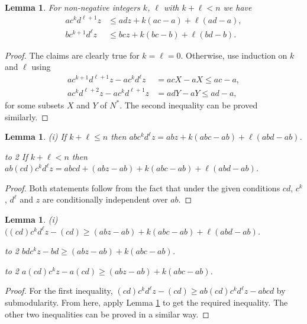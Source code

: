 \documentclass[reqno]{amsart}
\newtheorem{lemma}[theorem]{Lemma}
\theoremstyle{definition}
\renewcommand\ge{\geqslant}\renewcommand\le{\leqslant}
\def\titem#1{\noindent\hbox to 2\parindent{\hss\upshape
#1}\space\ignorespaces\advance\leftmargin2\parindent}
\begin{document}
\begin{lemma}\label{lemma:abdz}
For non-negative integers $k$, $\ell$ with $k+\ell<n$ we have
\begin{align*}
  ac^kd^{\ell+1}z &\le adz + k(ac-a) + \ell(ad-a), \\
  bc^{k+1}d^\ell z &\le bcz + k(bc-b) + \ell(bd-b).
\end{align*}
\end{lemma}
\begin{proof}
The claims are clearly true for $k=\ell=0$. Otherwise, use induction on $k$
and $\ell$ using
\begin{align*}
   ac^{k+1}d^{\ell+1}z - ac^kd^\ell z &= acX - aX \le ac -a, \\
   ac^kd^{\ell+2}z - ac^kd^{\ell+1}z &= adY - aY \le ad -a,
\end{align*}
for some subsets $X$ and $Y$ of $N^*$. The second inequality can
be proved similarly.
\end{proof}

\begin{lemma}\label{lemma:abxx}%
{\upshape(i)}
If $k+\ell\le n$ then $ abc^kd^\ell z = abz + k(abc-ab) +
\ell(abd-ab)$.

\titem{(ii)} If $k+\ell<n$ then $ab(cd) c^kd^\ell z= abcd +
(abz-ab)+k(abc-ab)+\ell(abd-ab)$.
\end{lemma}

\begin{proof}
Both statements follow from the fact that under the given conditions
$cd$, $c^k$, $d^\ell$ and $z$ are conditionally independent over $ab$.
\end{proof}

\begin{lemma}\label{lemma:upb}%
{\upshape(i)} $((cd)c^kd^\ell z - (cd) \ge (abz-ab)+k(abc-ab)+\ell(abd-ab)$.

\titem{(ii)}
$bdc^kz -bd \ge (abz-ab) + k(abc-ab)$.

\titem{(iii)}
$a(cd)c^kz - a(cd) \ge (abz-ab) + k(abc-ab)$.
\end{lemma}
\begin{proof}
For the first inequality, $(cd)c^kd^\ell z - (cd) \ge ab(cd)c^kd^\ell z -
abcd$ by submodularity. From here, apply Lemma \ref{lemma:abxx} to get the
required inequality. The other two inequalities can be proved in a similar
way.
\end{proof}
\end{document}
